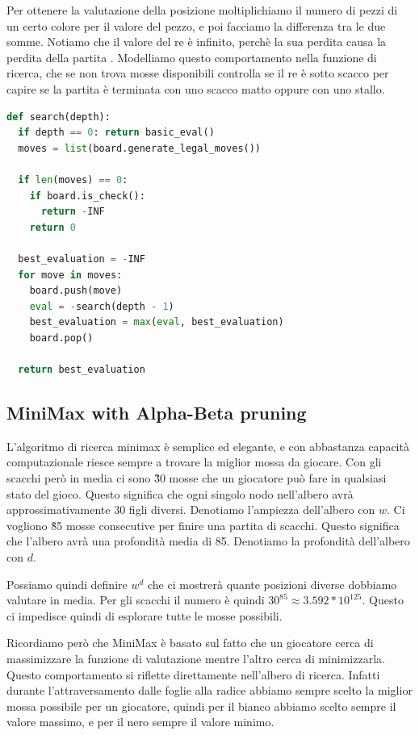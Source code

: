 \documentclass{article}
\begin{document}
Per ottenere la valutazione della posizione moltiplichiamo il numero di pezzi di un certo colore per il valore del pezzo, e poi facciamo la differenza tra le due somme.
Notiamo che il valore del re è infinito, perchè la sua perdita causa la perdita della partita \cite{wikipediaChessPiece}.
Modelliamo questo comportamento nella funzione di ricerca, che se non trova mosse disponibili controlla se il re è sotto scacco per capire se la partita è terminata con uno scacco matto oppure con uno stallo.

\begin{lstlisting}[language=python]
def search(depth):
  if depth == 0: return basic_eval()
  moves = list(board.generate_legal_moves())

  if len(moves) == 0:
    if board.is_check():
      return -INF
    return 0
    
  best_evaluation = -INF
  for move in moves:
    board.push(move)
    eval = -search(depth - 1)
    best_evaluation = max(eval, best_evaluation)
    board.pop()

  return best_evaluation
\end{lstlisting}

\subsection{MiniMax with Alpha-Beta pruning}

L'algoritmo di ricerca minimax è semplice ed elegante, e con abbastanza capacità computazionale riesce sempre a trovare la miglior mossa da giocare.
Con gli scacchi però in media ci sono \~30 mosse che un giocatore può fare in qualsiasi stato del gioco.
Questo significa che ogni singolo nodo nell'albero avrà approssimativamente 30 figli diversi.
Denotiamo l'ampiezza dell'albero con $w$.
Ci vogliono \~85 mosse consecutive per finire una partita di scacchi.
Questo significa che l'albero avrà una profondità media di 85.
Denotiamo la profondità dell'albero con $d$.

Possiamo quindi definire $w^d$ che ci mostrerà quante posizioni diverse dobbiamo valutare in media.
Per gli scacchi il numero è quindi $30^{85} \approx 3.592 * 10^{125}$.
Questo ci impedisce quindi di esplorare tutte le mosse possibili.

Ricordiamo però che MiniMax è basato sul fatto che un giocatore cerca di massimizzare la funzione di valutazione mentre l'altro cerca di minimizzarla.
Questo comportamento si riflette direttamente nell'albero di ricerca.
Infatti durante l'attraversamento dalle foglie alla radice abbiamo sempre scelto la miglior mossa possibile per un giocatore, quindi per il bianco abbiamo scelto sempre il valore massimo, e per il nero sempre il valore minimo.
\end{document}
